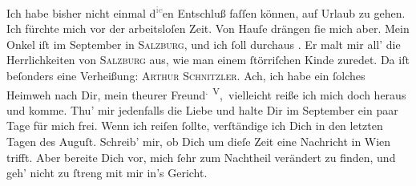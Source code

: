 \pstart
           Ich habe bisher nicht einmal d\substVorne{}\textsuperscript{\textcolor{gray}{ie}}\substDazwischen{}en\substHinten{} Entschluß faſſen können, auf Urlaub zu gehen. {\pb}Ich fürchte mich vor der arbeitsloſen Zeit. Von
               Hauſe drängen ſie mich aber. Mein Onkel iſt im September in \textsc{Salzburg}, und ich ſoll durchaus \label{K_L02711-2v}\label{K_L02711-2}. Er malt mir all’ die Herrlichkeiten von \textsc{Salzburg} aus, wie man einem ſtörriſchen Kinde zuredet. Da iſt beſonders eine Verheißung:
                  \textsc{Arthur Schnitzler}. Ach, ich habe ein ſolches Heimweh
               nach Dir, mein theurer Freund\substVorne{}\textsuperscript{. V}\substDazwischen{}, v\substHinten{}ielleicht reiße ich mich doch heraus und komme. Thu’ mir jedenfalls die Liebe
               und halte Dir im September ein paar Tage für mich frei.
               Wenn ich reiſen ſollte, verſtändige ich Dich {\pb}in den
               letzten Tagen des Auguſt. Schreib’ mir, ob Dich um dieſe
               Zeit eine Nachricht in Wien trifft. Aber bereite
               Dich vor, mich ſehr zum Nachtheil verändert zu finden, und geh’ nicht zu ſtreng mit
               mir in’s Gericht.\pend
           
